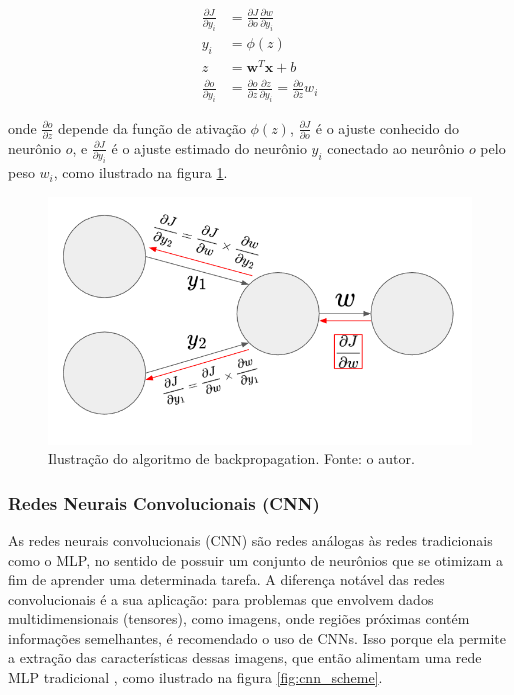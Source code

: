 \begin{align}
    \frac{\partial J}{\partial y_i} &= \frac{\partial J}{\partial o}\frac{\partial w}{\partial y_i} \label{eq:backprop_start}  \\
    y_i &= \phi(z) \\
    z &= \mathbf{w}^T\mathbf{x} + b \\
    \frac{\partial o}{\partial y_i} &= \frac{\partial o}{\partial z}\frac{\partial z}{\partial y_i}  = \frac{\partial o}{\partial z}w_i \label{eq:backprop_end}
\end{align}

onde $ \frac{\partial o}{\partial z}$ depende da função de ativação $\phi(z)$, $\frac{\partial J}{\partial o}$ é o ajuste conhecido do neurônio $o$, e $\frac{\partial J}{\partial y_i}$ é o ajuste estimado do neurônio $y_i$ conectado ao neurônio $o$ pelo peso $w_i$, como ilustrado na figura \ref{fig:backprop}.

\begin{figure}[hbt!]
    \centering
    \includegraphics[width=0.8\linewidth]{Imagens/chap02/backprop.png}
    \caption{Ilustração do algoritmo de backpropagation. Fonte: o autor.}
    \label{fig:backprop}
\end{figure}

\subsubsection{Redes Neurais Convolucionais (CNN)}
As redes neurais convolucionais (CNN) são redes análogas às redes tradicionais como o MLP, no sentido de possuir um conjunto de neurônios que se otimizam a fim de aprender uma determinada tarefa. A diferença notável das redes convolucionais é a sua aplicação: para problemas que envolvem dados multidimensionais (tensores), como imagens, onde regiões próximas contém informações semelhantes, é recomendado o uso de CNNs. Isso porque ela permite a extração das características dessas imagens, que então alimentam uma rede MLP tradicional \cite{o2015introduction}, como ilustrado na figura \ref{fig:cnn_scheme}.

